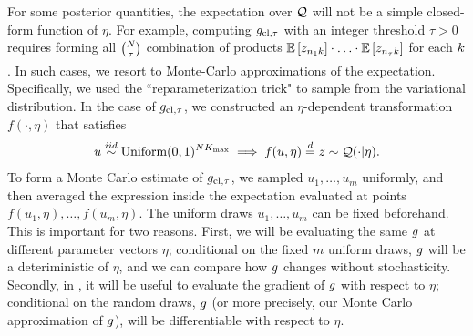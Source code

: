 For some posterior quantities, the expectation over $\mathcal{Q}$ will not be a simple
closed-form function of $\eta$.
For example, computing $g_{\text{cl},\tau}$ with an integer threshold $\tau > 0$
requires forming all ${N\choose\tau}$ combination of products
$\underset{}{\mathbb{E}}\left[z_{n_1k}\right]\cdot \ldots \cdot \underset{}{\mathbb{E}}\left[z_{n_\tau k}\right]$
for each $k$.
In such cases, we resort to Monte-Carlo approximations of the expectation.
Specifically, we used the ``reparameterization trick"
to sample from the variational distribution.
In the case of $g_{\text{cl},\tau}$,
we constructed an $\eta$-dependent transformation
$f(\cdot, \eta)$ that satisfies
\begin{align*}
  u \overset{iid}{\sim}\text{Uniform}(0, 1)^{N{K_{\mathrm{max}}}} \implies
  f(u, \eta) \stackrel{d}{=} z \sim \mathcal{Q}(\cdot | \eta).
\end{align*}
To form a Monte Carlo estimate of $g_{\text{cl},\tau}$,
we sampled $u_1, \dots, u_m$ uniformly,
and then averaged the expression inside the expectation evaluated at points
$f(u_1, \eta), \ldots, f(u_m, \eta)$.
The uniform draws $u_1, \dots, u_m$ can be fixed beforehand.
This is important for two reasons.
First, we will be evaluating the same $g$ at different parameter vectors $\eta$;
conditional on the fixed $m$ uniform draws, $g$ will be a deteriministic
of $\eta$, and we can compare how $g$ changes without stochasticity.
Secondly, in , it will be useful to evaluate the
gradient of $g$ with respect to $\eta$; conditional on the random draws,
$g$ (or more precisely, our Monte Carlo approximation of $g$), will be
differentiable with respect to $\eta$.

